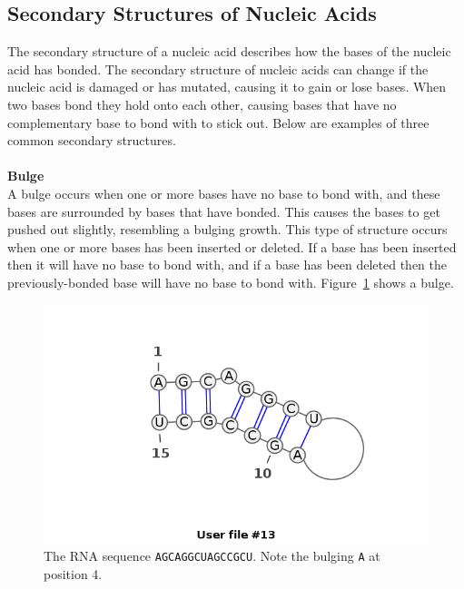 

\subsection{Secondary Structures of Nucleic Acids}\label{structs}
The secondary structure of a nucleic acid describes how the bases of the 
nucleic acid has bonded. The secondary structure of nucleic acids can change if 
the nucleic acid is damaged or has mutated, causing it to gain or lose 
bases. When two bases bond they hold onto each other, causing bases that 
have no complementary base to bond with to stick out. Below are examples of three 
common secondary structures.\\\\
\textbf{Bulge}\\ 
A bulge occurs when one or more bases have no base to bond with, and these 
bases are surrounded by bases that have bonded. This causes the bases to get 
pushed out slightly, resembling a bulging growth. This type of structure occurs 
when one or more bases has been inserted or deleted. If a base has been 
inserted then it will have no base to bond with, and if a base has been deleted 
then the previously-bonded base will have no base to bond with. Figure~\ref{fig:bulge} shows a bulge.

\begin{figure}[H]
\centering
\includegraphics[scale=0.4]{./lib/bulge.png}
\caption{The RNA sequence {\tt AGCAGGCUAGCCGCU}. Note the bulging {\tt A} at position 4.}
\label{fig:bulge}
\end{figure}~
\\
